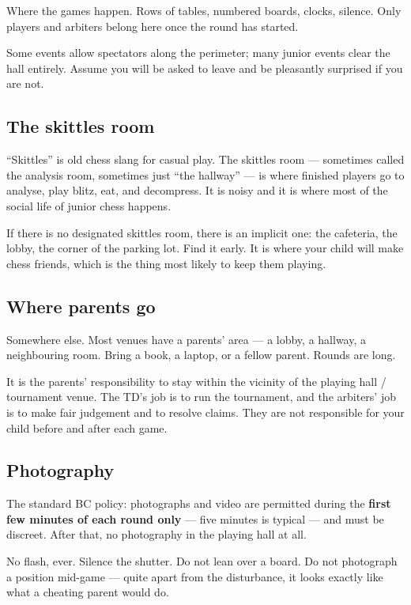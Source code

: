 \documentclass[10pt,letterpaper]{article}
\begin{document}
Where the games happen. Rows of tables, numbered boards, clocks, silence. Only
players and arbiters belong here once the round has started.

Some events allow spectators along the perimeter; many junior events clear the
hall entirely. Assume you will be asked to leave and be pleasantly surprised if
you are not.

\subsection{The skittles room}

``Skittles'' is old chess slang for casual play. The skittles room --- sometimes
called the analysis room, sometimes just ``the hallway'' --- is where finished
players go to analyse, play blitz, eat, and decompress. It is noisy and it is
where most of the social life of junior chess happens.

If there is no designated skittles room, there is an implicit one: the cafeteria,
the lobby, the corner of the parking lot. Find it early. It is where your child
will make chess friends, which is the thing most likely to keep them playing.

\subsection{Where parents go}

Somewhere else. Most venues have a parents' area --- a lobby, a hallway, a
neighbouring room. Bring a book, a laptop, or a fellow parent. Rounds are long.

It is the parents' responsibility to stay within the vicinity of the playing hall / tournament venue. The TD's job is to run the tournament, and the arbiters' job is to make fair judgement and to resolve claims. They are not responsible for your child before and after each game.

\subsection{Photography}

The standard BC policy: photographs and video are permitted during the
\textbf{first few minutes of each round only} --- five minutes is typical ---
and must be discreet. After that, no photography in the playing hall at all.

No flash, ever. Silence the shutter. Do not lean over a board. Do not photograph
a position mid-game --- quite apart from the disturbance, it looks exactly like
what a cheating parent would do.
\end{document}
